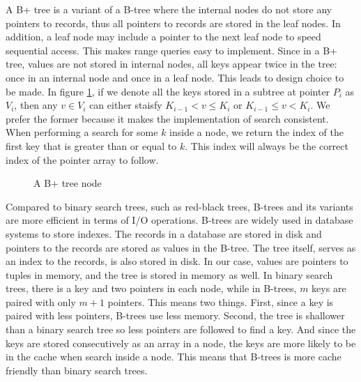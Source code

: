 \documentclass[11pt]{report}
\theoremstyle{definition}
\begin{document}
A B+ tree is a variant of a B-tree where the internal nodes do not store any pointers to records, thus all pointers to records are stored in the leaf nodes. In addition, a leaf node may include a pointer to the next leaf node to speed sequential access. This makes range queries easy to implement. Since in a B+ tree, values are not stored in internal nodes, all keys appear twice in the tree: once in an internal node and once in a leaf node. This leads to design choice to be made. In figure \ref{fig:btree_node}, if we denote all the keys stored in a subtree at pointer $P_i$ as $V_i$, then any $v \in V_i$ can either staisfy $K_{i-1} < v \leq K_i$ or $K_{i-1} \leq v < K_i$. We prefer the former because it makes the implementation of search consistent. When performing a search for some $k$ inside a node, we return the index of the first key that is greater than or equal to $k$. This index will always be the correct index of the pointer array to follow.

\begin{figure}[h]
  \centering
  \vspace{0.5em}
  \caption{A B+ tree node}
  \label{fig:btree_node}
\end{figure}


Compared to binary search trees, such as red-black trees, B-trees and its variants are more efficient in terms of I/O operations. B-trees are widely used in database systems to store indexes. The records in a database are stored in disk and pointers to the records are stored as values in the B-tree. The tree itself, serves as an index to the records, is also stored in disk. In our case, values are pointers to tuples in memory, and the tree is stored in memory as well. In binary search trees, there is a key and two pointers in each node, while in B-trees, $m$ keys are paired with only $m+1$ pointers. This means two things. First, since a key is paired with less pointers, B-trees use less memory. Second, the tree is shallower than a binary search tree so less pointers are followed to find a key. And since the keys are stored consecutively as an array in a node, the keys are more likely to be in the cache when search inside a node. This means that B-trees is more cache friendly than binary search trees.
\end{document}
